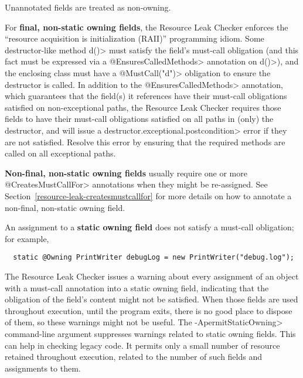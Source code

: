 Unannotated fields are treated as non-owning.

For \textbf{final, non-static owning fields},
the Resource Leak Checker enforces the ``resource acquisition is
initialization (RAII)'' programming idiom.  Some
destructor-like method \<d()> must satisfy the field's must-call obligation
(and this fact must be expressed via a \<@EnsuresCalledMethods> annotation on \<d()>),
and the enclosing class must have a \<@MustCall("d")> obligation to
ensure the destructor is called. In addition to the \<@EnsuresCalledMethods> annotation,
which guarantees that the field(s) it references have their must-call obligations satisfied
on non-exceptional paths, the Resource Leak Checker requires those fields to have their must-call
obligations satisfied on all paths in (only) the destructor, and will issue a \<destructor.exceptional.postcondition>
error if they are not satisfied. Resolve this error by ensuring that the required methods are called
on all exceptional paths.

\textbf{Non-final, non-static owning fields} usually require one or more \<@CreatesMustCallFor> annotations
when they might be re-assigned. See Section~\ref{resource-leak-createsmustcallfor} for
more details on how to annotate a non-final, non-static owning field.

An assignment to a \textbf{static owning field} does not satisfy a
must-call obligation; for example,

\begin{smaller}
\begin{Verbatim}
  static @Owning PrintWriter debugLog = new PrintWriter("debug.log");
\end{Verbatim}
\end{smaller}

\noindent
The Resource Leak Checker issues a warning about every assignment of an
object with a must-call annotation into a static owning field,
indicating that the obligation of the field's content might not be
satisfied.  When those fields are used throughout execution, until the
program exits, there is no good place to dispose of them, so these warnings
might not be useful.  The \<-ApermitStaticOwning> command-line argument
suppresses warnings related to static owning fields.  This can help in
checking legacy code.  It permits only a small number of resource retained
throughout execution, related to the number of such fields and assignments
to them.



